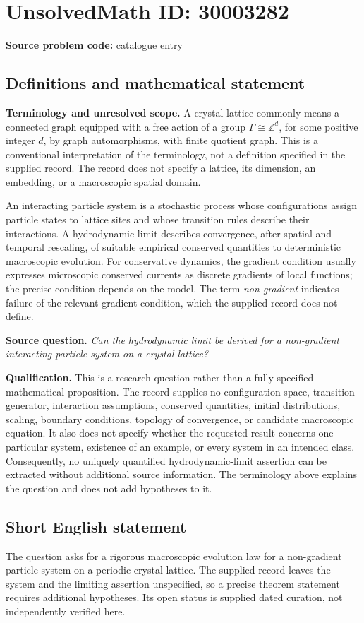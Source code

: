 \documentclass[11pt]{article}
\newcommand{\Z}{\mathbb{Z}}
\begin{document}
\section*{UnsolvedMath ID: 30003282}
\textbf{Source problem code:} catalogue entry
\subsection{Definitions and mathematical statement}
\textbf{Terminology and unresolved scope.} A crystal lattice commonly means a connected graph equipped with a free action of a group \(\Gamma\cong\Z^d\), for some positive integer \(d\), by graph automorphisms, with finite quotient graph. This is a conventional interpretation of the terminology, not a definition specified in the supplied record. The record does not specify a lattice, its dimension, an embedding, or a macroscopic spatial domain.

An interacting particle system is a stochastic process whose configurations assign particle states to lattice sites and whose transition rules describe their interactions. A hydrodynamic limit describes convergence, after spatial and temporal rescaling, of suitable empirical conserved quantities to deterministic macroscopic evolution. For conservative dynamics, the gradient condition usually expresses microscopic conserved currents as discrete gradients of local functions; the precise condition depends on the model. The term \emph{non-gradient} indicates failure of the relevant gradient condition, which the supplied record does not define.

\textbf{Source question.} \emph{Can the hydrodynamic limit be derived for a non-gradient interacting particle system on a crystal lattice?}

\textbf{Qualification.} This is a research question rather than a fully specified mathematical proposition. The record supplies no configuration space, transition generator, interaction assumptions, conserved quantities, initial distributions, scaling, boundary conditions, topology of convergence, or candidate macroscopic equation. It also does not specify whether the requested result concerns one particular system, existence of an example, or every system in an intended class. Consequently, no uniquely quantified hydrodynamic-limit assertion can be extracted without additional source information. The terminology above explains the question and does not add hypotheses to it.
\subsection{Short English statement}
The question asks for a rigorous macroscopic evolution law for a non-gradient particle system on a periodic crystal lattice. The supplied record leaves the system and the limiting assertion unspecified, so a precise theorem statement requires additional hypotheses. Its open status is supplied dated curation, not independently verified here.
\end{document}
